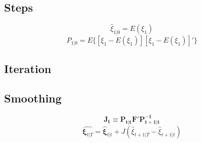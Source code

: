 \documentclass[11pt]{article}
\begin{document}
\subsection{Steps}

$$
\hat{\xi}_{1|0} = E(\xi_1)
$$
$$
P_{1|0} = E\{[\xi_1 - E(\xi_1)][\xi_1 - E(\xi_1)]'\}
$$

\subsection{Iteration}


\subsection{Smoothing}
$$
\mathbf{J_t} \equiv \mathbf{P_{t|t}F'P^{-1}_{t+1|t}}
$$
$$
\hat{\mathbf{\xi}_{t|T}} = \hat{\mathbf{\xi}}_{t|t} + J(\hat{\xi}_{t+1|T} - \hat{\xi}_{t+1|t})
$$
\end{document}
